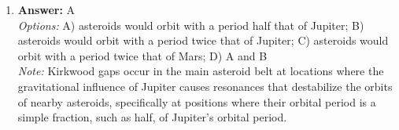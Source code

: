 \documentclass[12pt]{article}
\begin{document}
\begin{enumerate}[label=\arabic*.]
\\ \textit{Note:} The Trojan asteroids are located at stable Lagrange points in Jupiter's orbit, specifically 60 degrees ahead of and behind the planet, due to the gravitational influence of both Jupiter and the Sun.
\item \textbf{Answer:} A
\\ \textit{Options:} A) asteroids would orbit with a period half that of Jupiter; B) asteroids would orbit with a period twice that of Jupiter; C) asteroids would orbit with a period twice that of Mars; D) A and B
\\ \textit{Note:} Kirkwood gaps occur in the main asteroid belt at locations where the gravitational influence of Jupiter causes resonances that destabilize the orbits of nearby asteroids, specifically at positions where their orbital period is a simple fraction, such as half, of Jupiter's orbital period.
\end{enumerate}
\end{document}
